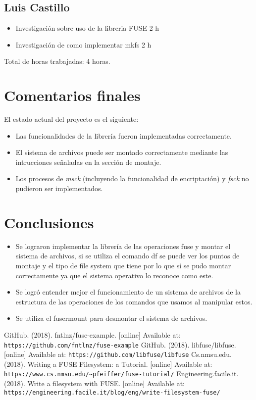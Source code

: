 \documentclass{article}
\begin{document}
\subsection{Luis Castillo}
\begin{itemize}
  \item Investigación sobre uso de la libreria FUSE 2 h
  \item Investigación de como implementar mkfs 2 h
\end{itemize}
Total de horas trabajadas: 4 horas.

\section{Comentarios finales}
  El estado actual del proyecto es el siguiente:
  \begin{itemize}
    \item Las funcionalidades de la librer\'ia fueron implementadas correctamente.
    \item El sistema de archivos puede ser montado correctamente mediante las intrucciones se\~naladas en la secci\'on de montaje.
    \item Los procesos de \emph{msck} (incluyendo la funcionalidad de encriptaci\'on) y \emph{fsck} no pudieron ser implementados.
  \end{itemize}

\section{Conclusiones}
\begin{itemize}
  \item Se lograron implementar la librería de las operaciones fuse y montar el sistema de archivos, si se utiliza el comando df se puede ver los puntos de montaje y el tipo de file system que tiene por lo que sí se pudo montar correctamente ya que el sistema operativo lo reconoce como este. 
  \item Se logró entender mejor el funcionamiento de un sistema de archivos de la estructura de las operaciones de los comandos que usamos al manipular estos. 
  \item Se utiliza el fusermount para desmontar el sistema de archivos.
\end{itemize}

\begin{thebibliography}{99}
   GitHub. (2018). fntlnz/fuse-example. [online] Available at: \texttt{https://github.com/fntlnz/fuse-example}
   GitHub. (2018). libfuse/libfuse. [online] Available at: \texttt{https://github.com/libfuse/libfuse}
   Cs.nmsu.edu. (2018). Writing a FUSE Filesystem: a Tutorial. [online] Available at: \texttt{https://www.cs.nmsu.edu/\~{}pfeiffer/fuse-tutorial/}
   Engineering.facile.it. (2018). Write a filesystem with FUSE. [online] Available at: \texttt{https://engineering.facile.it/blog/eng/write-filesystem-fuse/}
\end{thebibliography}
\end{document}
